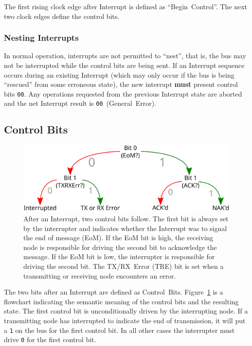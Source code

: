 The first rising clock edge after Interrupt is defined as ``Begin~Control''.
The next two clock edges define the control bits.

\subsubsection{Nesting Interrupts}
In normal operation, interrupts are not permitted to ``nest'', that is, the
bus may not be interrupted while the control bits are being sent. If an
Interrupt sequence occurs during an existing Interrupt (which may only occur
if the bus is being ``rescued'' from some erroneous state), the new interrupt
{\bf must} present control bits {\tt 00}. Any operations requested from the
previous Interrupt state are aborted and the net Interrupt result is
{\tt 00}~(General~Error).

\subsection{Control Bits}
\label{sec:protocol-control}

\begin{figure}
  \includegraphics[width=\linewidth]{img/control_bits}
  \caption{After an Interrupt, two control bits follow. The first bit is
    always set by the interrupter and indicates whether the Interrupt was to
    signal the end of message (EoM). If the EoM bit is high, the receiving
    node is responsible for driving the second bit to acknowledge the message.
    If the EoM bit is low, the interrupter is responsible for driving the
    second bit. The TX/RX~Error (TRE) bit is set when a transmitting or
    receiving node encounters an error.
  }
  \label{fig:control-bits}
\end{figure}

The two bits after an Interrupt are defined as Control~Bits.
Figure~\ref{fig:control-bits} is a flowchart indicating the semantic meaning
of the control bits and the resulting state. The first control bit is
unconditionally driven by the interrupting node. If a transmitting node has
interrupted to indicate the end of transmission, it will put a {\tt 1} on the
bus for the first control bit. In all other cases the interrupter must drive
{\tt 0} for the first control bit.

